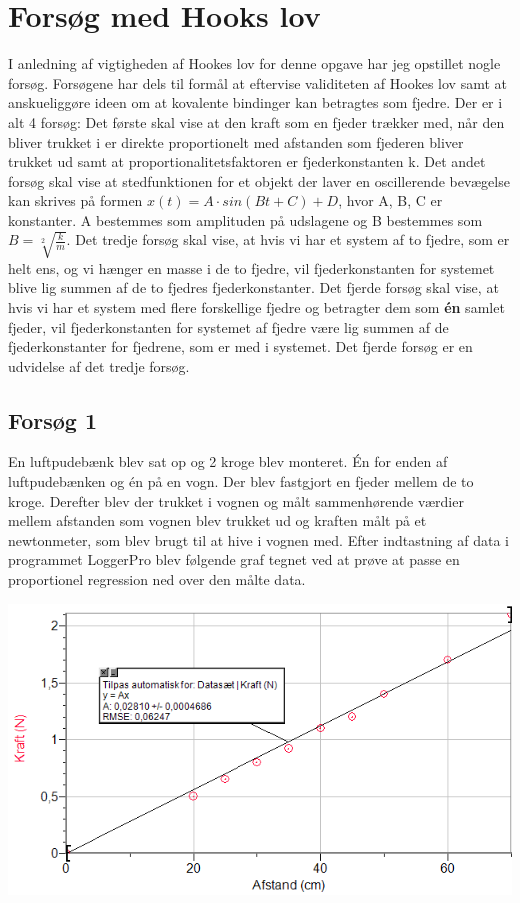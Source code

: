 \section{Forsøg med Hooks lov}
I anledning af vigtigheden af Hookes lov for denne opgave har jeg opstillet nogle forsøg. Forsøgene har dels til formål at eftervise validiteten af Hookes lov samt at anskueliggøre ideen om at kovalente bindinger kan betragtes som fjedre. Der er i alt 4 forsøg: Det første skal vise at den kraft som en fjeder trækker med, når den bliver trukket i er direkte proportionelt med afstanden som fjederen bliver trukket ud samt at proportionalitetsfaktoren er fjederkonstanten k. Det andet forsøg skal vise at stedfunktionen for et objekt der laver en oscillerende bevægelse kan skrives på formen $x(t) = A \cdot sin(B t + C) + D$, hvor A, B, C er konstanter. A bestemmes som amplituden på udslagene og B bestemmes som $B=\sqrt[2]{\frac{k}{m}}$. Det tredje forsøg skal vise, at hvis vi har et system af to fjedre, som er helt ens, og vi hænger en masse i de to fjedre, vil fjederkonstanten for systemet blive lig summen af de to fjedres fjederkonstanter. Det fjerde forsøg skal vise, at hvis vi har et system med flere forskellige fjedre og betragter dem som \textbf{én} samlet fjeder, vil fjederkonstanten for systemet af fjedre være lig summen af de fjederkonstanter for fjedrene, som er med i systemet. Det fjerde forsøg er en udvidelse af det tredje forsøg. 

\subsection{Forsøg 1}
En luftpudebænk blev sat op og 2 kroge blev monteret. Én for enden af luftpudebænken og én på en vogn. Der blev fastgjort en fjeder mellem de to kroge. Derefter blev der trukket i vognen og målt sammenhørende værdier mellem afstanden som vognen blev trukket ud og kraften målt på et newtonmeter, som blev brugt til at hive i vognen med. Efter indtastning af data i programmet LoggerPro blev følgende graf tegnet ved at prøve at passe en proportionel regression ned over den målte data. 

\begin{center}
\includegraphics[scale=0.7]{Billeder/graf1}
\end{center}

